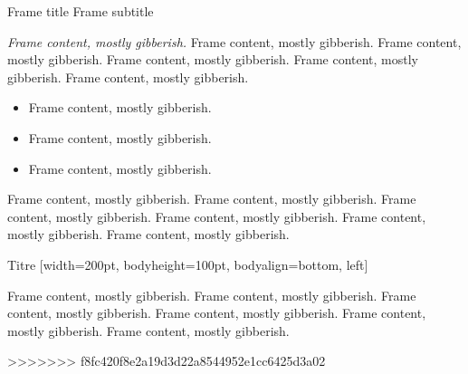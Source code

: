 \documentclass[9pt]{beamer}
\begin{document}
\begin{frame}
  {Frame title}
  {Frame subtitle}

  \begingroup
    \emph{Frame content, mostly gibberish.} Frame content, mostly
    gibberish. Frame content, mostly gibberish. Frame content, mostly
    gibberish. Frame content, mostly gibberish. Frame content, mostly
    gibberish.
  \endgroup

  \vskip10pt
  \begin{block}{}
    \begin{itemize}
    \item Frame content, mostly gibberish.
    \item Frame content, mostly gibberish.
    \item Frame content, mostly gibberish.
    \end{itemize}
  \end{block}

  \vskip10pt%
  \begin{framedtext}%
    [offset=8pt, tikzoptions={draw=darkorange, very thick,
                              rounded corners=2pt}]%
    Frame content, mostly gibberish. Frame content, mostly gibberish.
    Frame content, mostly gibberish. Frame content, mostly gibberish.
    Frame content, mostly gibberish. Frame content, mostly gibberish.
  \end{framedtext}

  \vskip10pt
  \begin{center}
    \leavevmode
    \hfil
  \end{center}

\end{frame}

\begin{frame}

  \begin{block}{Titre}
    [width=200pt, bodyheight=100pt, bodyalign={bottom, left}]

    Frame content, mostly gibberish. Frame content, mostly gibberish.
    Frame content, mostly gibberish. Frame content, mostly gibberish.
    Frame content, mostly gibberish. Frame content, mostly gibberish.
  \end{block}

\end{frame}
>>>>>>> f8fc420f8e2a19d3d22a8544952e1cc6425d3a02
\end{document}
